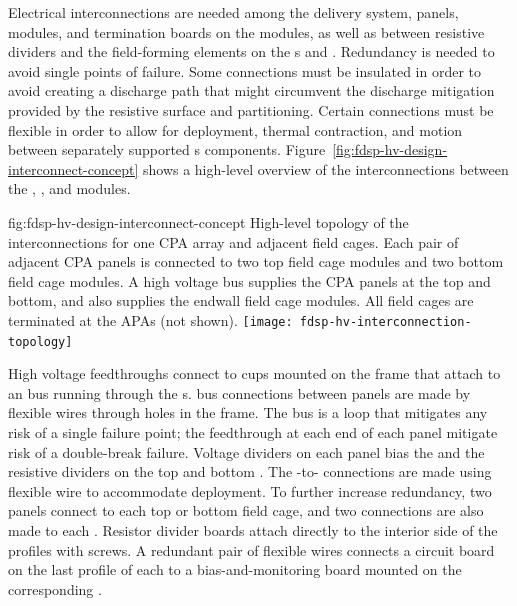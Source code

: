 Electrical interconnections are needed among the  delivery system,  panels,  modules, and termination
boards on the  modules, as well as between resistive dividers and
the field-forming elements on the s and .  %
Redundancy is
needed to avoid single points of failure. 
Some connections must be
insulated in order to avoid creating a discharge path that might
circumvent the discharge mitigation provided by the resistive 
surface and  partitioning.  Certain connections must be
flexible in order to allow for  deployment, thermal
contraction, and motion between separately supported s components.  Figure~\ref{fig:fdsp-hv-design-interconnect-concept} shows a high-level
overview of the interconnections between the , , and  modules.

\begin{dunefigure}{fig:fdsp-hv-design-interconnect-concept}
  {High-level topology of the  interconnections for one CPA array and adjacent field cages. Each pair of adjacent CPA panels is connected to two top field cage modules and two bottom field cage modules. A high voltage bus supplies the CPA panels at the top and bottom, and also supplies the endwall field cage modules. All field cages are terminated at the APAs (not shown).}
  \texttt{[image: fdsp-hv-interconnection-topology]}
\end{dunefigure}

High voltage feedthroughs connect to cups mounted on the  frame
that attach to an  bus running through the s.   bus connections
between  panels are made by flexible wires through holes in the
 frame. The  bus is a loop that mitigates any risk of a single
failure point; the feedthrough at each end of each  panel mitigate
risk of a double-break failure.  Voltage dividers on each  panel
bias the  and the resistive dividers on the top
and bottom .  The -to- connections are made using
flexible wire to accommodate  deployment.  To further
increase redundancy, two  panels connect to each top or bottom
field cage, and two connections are also made to each . Resistor divider boards attach directly to the interior side of
the  profiles with screws.   A redundant pair of flexible wires
connects a circuit board on the last profile of each  to a
bias-and-monitoring board mounted on the corresponding .

